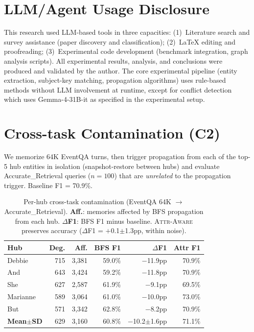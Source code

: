\documentclass{article}
\newcommand{\attraware}{\textsc{Attr-Aware}}
\begin{document}
\section*{LLM/Agent Usage Disclosure}

This research used LLM-based tools in three capacities:
(1)~Literature search and survey assistance (paper discovery and classification);
(2)~LaTeX editing and proofreading;
(3)~Experimental code development (benchmark integration, graph analysis scripts).
All experimental results, analysis, and conclusions were produced and validated by the author.
The core experimental pipeline (entity extraction, subject-key matching, propagation algorithms) uses rule-based methods without LLM involvement at runtime, except for conflict detection which uses Gemma-4-31B-it as specified in the experimental setup.






\appendix

\section{Cross-task Contamination (C2)}
\label{app:cross_task}

We memorize 64K EventQA turns, then trigger propagation from each of the top-5 hub entities in isolation (snapshot-restore between hubs) and evaluate Accurate\_Retrieval queries ($n{=}100$) that are \textit{unrelated} to the propagation trigger.
Baseline F1 = 70.9\%.

\begin{table}[htbp]
\centering
\footnotesize
\begin{tabular}{lrrrrr}
\toprule
\textbf{Hub} & \textbf{Deg.} & \textbf{Aff.} & \textbf{BFS F1} & \textbf{$\Delta$F1} & \textbf{Attr F1} \\
\midrule
Debbie   & 715 & 3{,}381 & 59.0\% & $-$11.9pp & 70.9\% \\
And      & 643 & 3{,}424 & 59.2\% & $-$11.8pp & 70.9\% \\
She      & 627 & 2{,}587 & 61.9\% & $-$9.1pp  & 69.5\% \\
Marianne & 589 & 3{,}064 & 61.0\% & $-$10.0pp & 73.0\% \\
But      & 571 & 3{,}342 & 62.8\% & $-$8.2pp  & 70.9\% \\
\midrule
\textbf{Mean$\pm$SD} & 629 & 3{,}160 & 60.8\% & $-$10.2$\pm$1.6pp & 71.1\% \\
\bottomrule
\end{tabular}
\caption{Per-hub cross-task contamination (EventQA 64K $\rightarrow$ Accurate\_Retrieval).
\textbf{Aff.}: memories affected by BFS propagation from each hub.
\textbf{$\Delta$F1}: BFS F1 minus baseline.
\attraware{} preserves accuracy ($\Delta$F1 = $+$0.1$\pm$1.3pp, within noise).}
\label{tab:cross_task}
\end{table}
\end{document}
